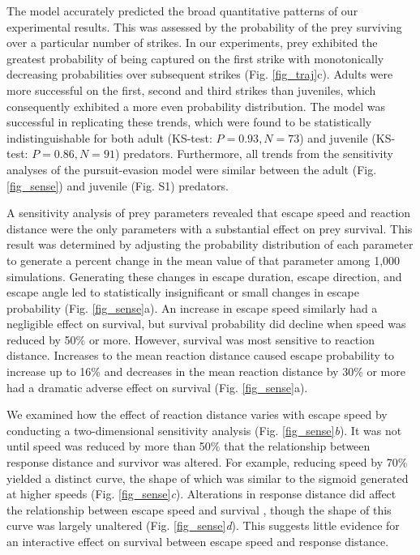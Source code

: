 \documentclass[]{rsos}%
\begin{document}
The model accurately predicted the broad quantitative patterns of our experimental results.
This was assessed by the probability of the prey surviving over a particular number of strikes. 
In our experiments, prey exhibited the greatest probability of being captured on the first strike with monotonically decreasing probabilities over subsequent strikes (Fig. \ref{fig_traj}c).
Adults were more successful on the first, second and third strikes than juveniles, which consequently exhibited a more even probability distribution.
The model was successful in replicating these trends, which were found to be statistically indistinguishable for both adult (KS-test: $P = 0.93, N = 73$) and juvenile (KS-test: $P = 0.86, N = 91$) predators. 
Furthermore, all trends from the sensitivity analyses of the pursuit-evasion model were similar between the adult (Fig. \ref{fig_sense}) and juvenile (Fig. S1) predators. 

A sensitivity analysis of prey parameters revealed that escape speed and reaction distance were the only parameters with a substantial effect on prey survival. 
This result was determined by adjusting the probability distribution of each parameter to generate a percent change in the mean value of that parameter among 1,000 simulations.
Generating these changes in escape duration, escape direction, and escape angle led to statistically insignificant or small changes in escape probability (Fig. \ref{fig_sense}a). 
An increase in escape speed similarly had a negligible effect on survival, but survival probability did decline when speed was reduced by 50\% or more.
However, survival was most sensitive to reaction distance.
Increases to the mean reaction distance caused escape probability to increase up to 16\% and decreases in the mean reaction distance by 30\% or more had a dramatic adverse effect on survival (Fig. \ref{fig_sense}a). 

We examined how the effect of reaction distance varies with escape speed by conducting a two-dimensional sensitivity analysis (Fig. \ref{fig_sense}\textit{b}).
It was not until speed was reduced by more than 50\% that the relationship between response distance and survivor was altered.
For example, reducing speed by 70\% yielded a distinct curve, the shape of which was similar to the sigmoid generated at higher speeds (Fig. \ref{fig_sense}\textit{c}). 
Alterations in response distance did affect the relationship between escape speed and survival , though the shape of this curve was largely unaltered (Fig. \ref{fig_sense}\textit{d}).
This suggests little evidence for an interactive effect on survival between escape speed and response distance.
\end{document}
